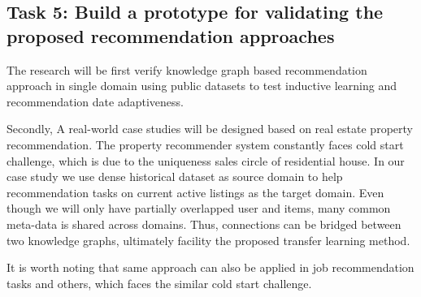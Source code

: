 \subsection{Task 5: Build a prototype for validating the proposed recommendation approaches}

The research will be first verify knowledge graph based recommendation approach in single domain using public datasets to test inductive learning and recommendation date adaptiveness.

Secondly, A real-world case studies will be designed based on real estate property recommendation. The property recommender system constantly faces cold start challenge, which is due to the uniqueness sales circle of residential house. 
In our case study we use dense historical dataset as source domain to help recommendation tasks on current active listings as the target domain.
Even though we will only have partially overlapped user and items, many common meta-data is shared across domains.
Thus, connections can be bridged between two knowledge graphs, ultimately facility the proposed transfer learning method.

It is worth noting that same approach can also be applied in job recommendation tasks and others, which faces the similar cold start challenge.
